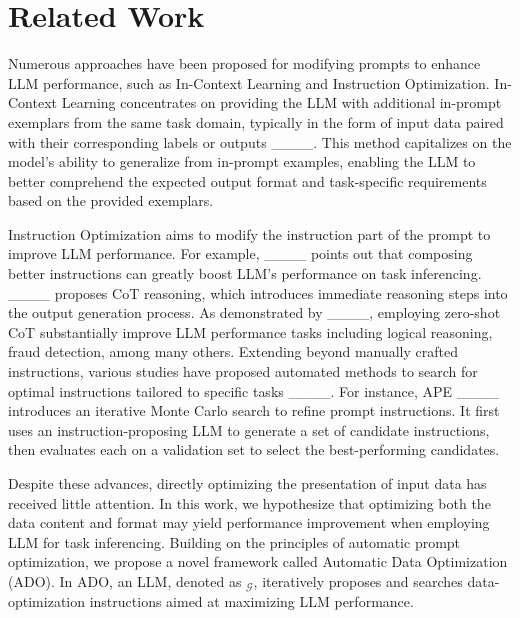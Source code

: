 \section{Related Work}
\label{sec:related}
Numerous approaches have been proposed for modifying prompts to enhance LLM performance, such as In-Context Learning and Instruction Optimization. In-Context Learning concentrates on providing the LLM with additional in-prompt exemplars from the same task domain, typically in the form of input data paired with their corresponding labels or outputs ____. This method capitalizes on the model's ability to generalize from in-prompt examples, enabling the LLM to better comprehend the expected output format and task-specific requirements based on the provided exemplars. 

Instruction Optimization aims to modify the instruction part of the prompt to improve LLM performance. For example, ____ points out that composing better instructions can greatly boost LLM's performance on task inferencing. ____ proposes CoT reasoning, which introduces immediate reasoning steps into the output generation process. As demonstrated by ____, employing zero-shot CoT substantially improve LLM performance tasks including logical reasoning, fraud detection, among many others. Extending beyond manually crafted instructions, various studies have proposed automated methods to search for optimal instructions tailored to specific tasks ____. For instance, APE ____ introduces an iterative Monte Carlo search to refine prompt instructions. It first uses an instruction-proposing LLM to generate a set of candidate instructions, then evaluates each on a validation set to select the best-performing candidates.

Despite these advances, directly optimizing the presentation of input data has received little attention. In this work, we hypothesize that optimizing both the data content and format may yield performance improvement when employing LLM for task inferencing. Building on the principles of automatic prompt optimization, we propose a novel framework called Automatic Data Optimization (ADO). In ADO, an LLM, denoted as $_{\mathcal{G}}$, iteratively proposes and searches data-optimization instructions aimed at maximizing LLM performance.



